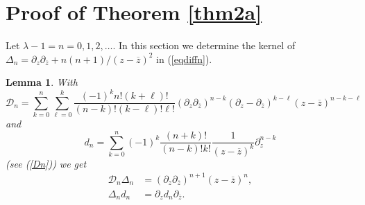 \documentclass[oneside]{amsart}
\newcommand{\zz}{{\overline{z}}}
\newcommand{\sD}{\mathcal{D}}
\theoremstyle{plain}
\newtheorem{lem}[thm]{Lemma}
\begin{document}
\section{Proof of Theorem \ref{thm2a}}\label{sectpf2a}
Let $\lambda-1=n=0,1,2,\ldots$. In this section we determine the kernel of $\Delta_n=\partial_z\partial_\zz+n(n+1)/(z-\zz)^2$ in (\ref{eqdiffn}).

\begin{lem}
With
\begin{equation}\label{sDdef}
\sD_n=\sum_{k=0}^n\sum_{\ell=0}^k\frac{(-1)^kn!(k+\ell)!}{(n-k)!(k-\ell)!\ell!}(\partial_z\partial_\zz)^{n-k}(\partial_z-\partial_\zz)^{k-\ell}(z-\zz)^{n-k-\ell}
\end{equation}
and
$$
d_n=\sum_{k=0}^n(-1)^k\frac{(n+k)!}{(n-k)!k!}\frac{1}{(z-\zz)^k}\partial_z^{n-k}
$$
(see (\ref{Dn})) we get
\begin{align}\label{eqprop4}
\sD_n\Delta_n&=(\partial_z\partial_\zz)^{n+1}(z-\zz)^n,\nonumber\\
\Delta_nd_n&=\partial_zd_n\partial_\zz.
\end{align}
\end{lem}
\end{document}

